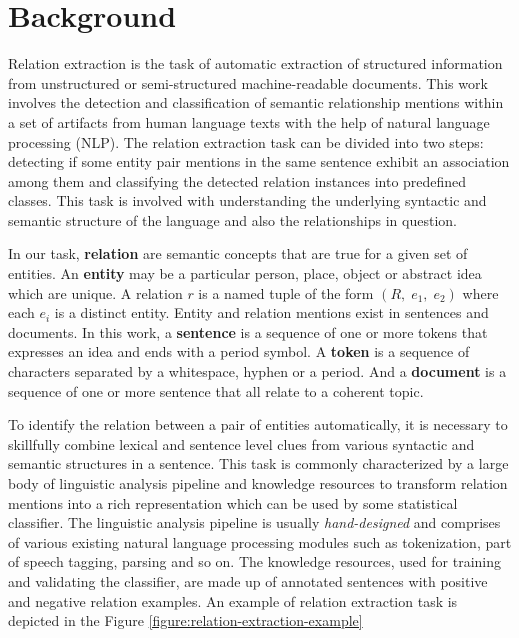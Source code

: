 \section{Background}
\label{section:background}

Relation extraction is the task of automatic extraction of structured information from unstructured or semi-structured machine-readable documents. This work involves the detection and classification of semantic relationship mentions within a set of artifacts from human language texts with the help of natural language processing (NLP). The relation extraction task can be divided into two steps: detecting if some entity pair mentions in the same sentence exhibit an association among them and classifying the detected relation instances into predefined classes. This task is involved with understanding the underlying syntactic and semantic structure of the language and also the relationships in question. 

In our task, {\bf relation} are semantic concepts that are true for a given set of entities. An {\bf entity} may be a particular person, place, object or abstract idea which are unique. A relation $r$ is a named tuple of the form $(R,\; e_1,\; e_2)$ where each $e_i$ is a distinct entity. Entity and relation mentions exist in sentences and documents. In this work, a {\bf sentence} is a sequence of one or more tokens that expresses an idea and ends with a period symbol. A {\bf token} is a sequence of characters separated by a whitespace, hyphen or a period. And a {\bf document} is a sequence of one or more sentence that all relate to a coherent topic.

To identify the relation between a pair of entities automatically, it is necessary to skillfully combine lexical and sentence level clues from various syntactic and semantic structures in a sentence. This task is commonly characterized by a large body of linguistic analysis pipeline and knowledge resources to transform relation mentions into a rich representation which can be used by some statistical classifier. The linguistic analysis pipeline is usually {\it hand-designed} and comprises of various existing natural language processing modules such as tokenization, part of speech tagging, parsing and so on. The knowledge resources, used for training and validating the classifier, are made up of annotated sentences with positive and negative relation examples. An example of relation extraction task is depicted in the Figure \ref{figure:relation-extraction-example}


